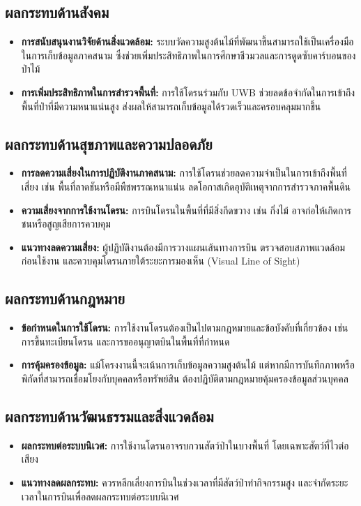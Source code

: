 \subsection{ผลกระทบด้านสังคม}
\begin{itemize}
    \item \textbf{การสนับสนุนงานวิจัยด้านสิ่งแวดล้อม:} ระบบวัดความสูงต้นไม้ที่พัฒนาขึ้นสามารถใช้เป็นเครื่องมือในการเก็บข้อมูลภาคสนาม ซึ่งช่วยเพิ่มประสิทธิภาพในการศึกษาชีวมวลและการดูดซับคาร์บอนของป่าไม้
    \item \textbf{การเพิ่มประสิทธิภาพในการสำรวจพื้นที่:} การใช้โดรนร่วมกับ UWB ช่วยลดข้อจำกัดในการเข้าถึงพื้นที่ป่าที่มีความหนาแน่นสูง ส่งผลให้สามารถเก็บข้อมูลได้รวดเร็วและครอบคลุมมากขึ้น
\end{itemize}

\subsection{ผลกระทบด้านสุขภาพและความปลอดภัย}
\begin{itemize}
    \item \textbf{การลดความเสี่ยงในการปฏิบัติงานภาคสนาม:} การใช้โดรนช่วยลดความจำเป็นในการเข้าถึงพื้นที่เสี่ยง เช่น พื้นที่ลาดชันหรือมีพืชพรรณหนาแน่น ลดโอกาสเกิดอุบัติเหตุจากการสำรวจภาคพื้นดิน
    \item \textbf{ความเสี่ยงจากการใช้งานโดรน:} การบินโดรนในพื้นที่ที่มีสิ่งกีดขวาง เช่น กิ่งไม้ อาจก่อให้เกิดการชนหรือสูญเสียการควบคุม
    \item \textbf{แนวทางลดความเสี่ยง:} ผู้ปฏิบัติงานต้องมีการวางแผนเส้นทางการบิน ตรวจสอบสภาพแวดล้อมก่อนใช้งาน และควบคุมโดรนภายใต้ระยะการมองเห็น (Visual Line of Sight)
\end{itemize}

\subsection{ผลกระทบด้านกฎหมาย}
\begin{itemize}
    \item \textbf{ข้อกำหนดในการใช้โดรน:} การใช้งานโดรนต้องเป็นไปตามกฎหมายและข้อบังคับที่เกี่ยวข้อง เช่น การขึ้นทะเบียนโดรน และการขออนุญาตบินในพื้นที่ที่กำหนด
    \item \textbf{การคุ้มครองข้อมูล:} แม้โครงงานนี้จะเน้นการเก็บข้อมูลความสูงต้นไม้ แต่หากมีการบันทึกภาพหรือพิกัดที่สามารถเชื่อมโยงกับบุคคลหรือทรัพย์สิน ต้องปฏิบัติตามกฎหมายคุ้มครองข้อมูลส่วนบุคคล
\end{itemize}

\subsection{ผลกระทบด้านวัฒนธรรมและสิ่งแวดล้อม}
\begin{itemize}
    \item \textbf{ผลกระทบต่อระบบนิเวศ:} การใช้งานโดรนอาจรบกวนสัตว์ป่าในบางพื้นที่ โดยเฉพาะสัตว์ที่ไวต่อเสียง
    \item \textbf{แนวทางลดผลกระทบ:} ควรหลีกเลี่ยงการบินในช่วงเวลาที่มีสัตว์ป่าทำกิจกรรมสูง และจำกัดระยะเวลาในการบินเพื่อลดผลกระทบต่อระบบนิเวศ
\end{itemize}